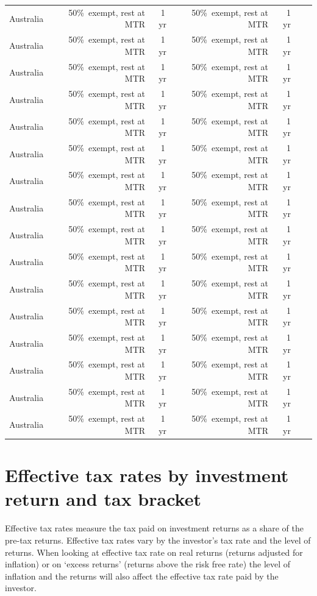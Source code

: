 \documentclass{grattan}\usepackage[]{graphicx}\usepackage[]{color}
\begin{document}
\begin{longtable}{lrrrrrr}
 Australia & 50\%\ exempt, rest at MTR & 1\,yr & 50\%\ exempt, rest at MTR & 1 yr \\ 
 Australia & 50\%\ exempt, rest at MTR & 1\,yr & 50\%\ exempt, rest at MTR & 1 yr \\ 
 Australia & 50\%\ exempt, rest at MTR & 1\,yr & 50\%\ exempt, rest at MTR & 1 yr \\ 
 Australia & 50\%\ exempt, rest at MTR & 1\,yr & 50\%\ exempt, rest at MTR & 1 yr \\ 
 Australia & 50\%\ exempt, rest at MTR & 1\,yr & 50\%\ exempt, rest at MTR & 1 yr \\ 
 Australia & 50\%\ exempt, rest at MTR & 1\,yr & 50\%\ exempt, rest at MTR & 1 yr \\ 
 Australia & 50\%\ exempt, rest at MTR & 1\,yr & 50\%\ exempt, rest at MTR & 1 yr \\ 
 Australia & 50\%\ exempt, rest at MTR & 1\,yr & 50\%\ exempt, rest at MTR & 1 yr \\ 
 Australia & 50\%\ exempt, rest at MTR & 1\,yr & 50\%\ exempt, rest at MTR & 1 yr \\ 
 Australia & 50\%\ exempt, rest at MTR & 1\,yr & 50\%\ exempt, rest at MTR & 1 yr \\ 
 Australia & 50\%\ exempt, rest at MTR & 1\,yr & 50\%\ exempt, rest at MTR & 1 yr \\ 
 Australia & 50\%\ exempt, rest at MTR & 1\,yr & 50\%\ exempt, rest at MTR & 1 yr \\ 
 Australia & 50\%\ exempt, rest at MTR & 1\,yr & 50\%\ exempt, rest at MTR & 1 yr \\ 
 Australia & 50\%\ exempt, rest at MTR & 1\,yr & 50\%\ exempt, rest at MTR & 1 yr \\ 
 Australia & 50\%\ exempt, rest at MTR & 1\,yr & 50\%\ exempt, rest at MTR & 1 yr \\ 
 Australia & 50\%\ exempt, rest at MTR & 1\,yr & 50\%\ exempt, rest at MTR & 1 yr \\ 
\end{longtable}
\renewcommand{\arraystretch}{1.0}
\twocolumn
\chapter{Effective tax rates by investment return and tax bracket}
Effective tax rates measure the tax paid on investment returns as a share of the pre-tax returns. Effective tax rates vary by the investor’s tax rate and the level of returns. When looking at effective tax rate on real returns (returns adjusted for inflation) or on `excess returns' (returns above the risk free rate) the level of inflation and the returns will also affect the effective tax rate paid by the investor. 
\end{document}
